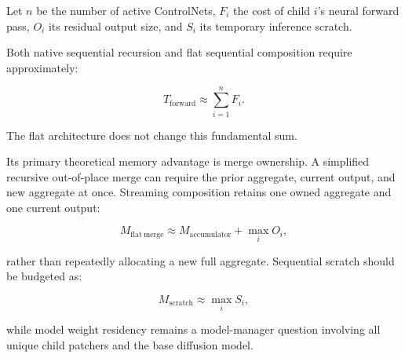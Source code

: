 \documentclass[11pt]{article}
\begin{document}
Let $n$ be the number of active ControlNets, $F_i$ the cost of child $i$’s neural forward pass, $O_i$ its residual output size, and $S_i$ its temporary inference scratch.

Both native sequential recursion and flat sequential composition require approximately:

\[
T_{\mathrm{forward}} \approx \sum_{i=1}^{n} F_i.
\]

The flat architecture does not change this fundamental sum.

Its primary theoretical memory advantage is merge ownership. A simplified recursive out-of-place merge can require the prior aggregate, current output, and new aggregate at once. Streaming composition retains one owned aggregate and one current output:

\[
M_{\mathrm{flat\ merge}} \approx M_{\mathrm{accumulator}} + \max_i O_i,
\]

rather than repeatedly allocating a new full aggregate. Sequential scratch should be budgeted as:

\[
M_{\mathrm{scratch}} \approx \max_i S_i,
\]

while model weight residency remains a model-manager question involving all unique child patchers and the base diffusion model.
\end{document}
